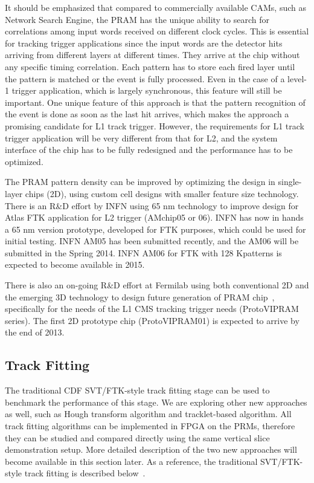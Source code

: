 \noindent It should be emphasized that compared to commercially available CAMs, such as Network Search Engine, the PRAM has the unique ability to search for correlations among input words received on different clock cycles. This is essential for tracking trigger applications since the input words are the detector hits arriving from different layers at different times. They arrive at the chip without any specific timing correlation. Each pattern has to store each fired layer until the pattern is matched or the event is fully processed. Even in the case of a level-1 trigger application, which is largely synchronous, this feature will still be important. One unique feature of this approach is that the pattern recognition of the event is done as soon as the last hit arrives, which makes the approach a promising candidate for L1 track trigger. However, the requirements for L1 track trigger application will be very different from that for L2, and the system interface of the chip has to be fully redesigned and the performance has to be optimized.

\noindent The PRAM pattern density can be improved by optimizing the design in single-layer chips (2D), using custom cell designs with smaller feature size technology. There is an R\&D effort by INFN using 65 nm technology to improve design for Atlas FTK application for L2 trigger (AMchip05 or 06). INFN has now in hands a 65 nm version prototype, developed for FTK purposes, which could be used for initial testing. INFN AM05 has been submitted recently, and the AM06 will be submitted in the Spring 2014. INFN AM06 for FTK with 128 Kpatterns is expected to become available in 2015.

\noindent  There is also an on-going R\&D effort at Fermilab using both conventional 2D and the emerging 3D technology to design future generation of PRAM chip~\cite{bib:VIP-11},\cite{bib:VIP-12} specifically for the needs of the L1 CMS tracking trigger needs (ProtoVIPRAM series). The first 2D prototype chip (ProtoVIPRAM01) is expected to arrive by the end of 2013.

\subsection{Track Fitting} 

\noindent The traditional CDF SVT/FTK-style track fitting stage can be used to benchmark the performance of this stage. We are exploring other new approaches as well, such as Hough transform algorithm and tracklet-based algorithm. All track fitting algorithms can be implemented in FPGA on the PRMs, therefore they can be studied and compared directly using the same vertical slice demonstration setup. More detailed description of the two new approaches will become available in this section later. As a reference, the traditional SVT/FTK-style track fitting is described below~\cite{bib:FTK-10}.

